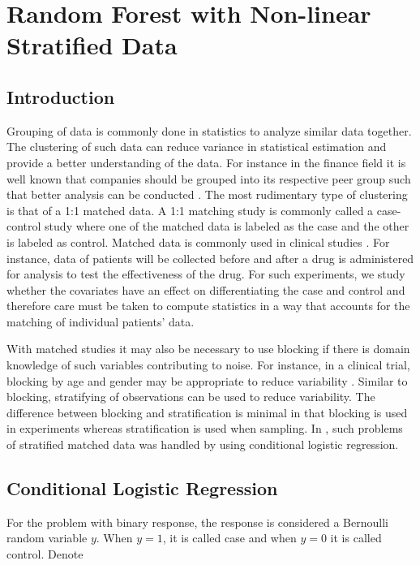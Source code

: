 \chapter{Random Forest with Non-linear Stratified Data}\label{chapter:RFStratum}
\section{Introduction}
Grouping of data is commonly done in statistics to analyze similar data together. The clustering of such data can reduce variance in statistical estimation and provide a better understanding of the data. For instance in the finance field it is well known that companies should be grouped into its respective peer group such that better analysis can be conducted \citep{Daniel97} \citep{Faulkender10}\citep{Bizjak08}\citep{Marsili02}. The most rudimentary type of clustering is that of a 1:1 matched data. A 1:1 matching study is commonly called a case-control study where one of the matched data is labeled as the case and the other is labeled as control. 
Matched data is commonly used in clinical studies \citep{Berg10}\citep{Austin08}. For instance, data of patients will be collected before and after a drug is administered for analysis to test the effectiveness of the drug. For such experiments, we study whether the covariates have an effect on differentiating the case and control and therefore care must be taken to compute statistics in a way that accounts for the matching of individual patients' data.

With matched studies it may also be necessary to use blocking if there is domain knowledge of such variables contributing to noise. For instance, in a clinical trial, blocking by age and gender may be appropriate to reduce variability \citep{Crespo11}. Similar to blocking, stratifying of observations can be used to reduce variability. The difference between blocking and stratification is minimal in that blocking is used in experiments whereas stratification is used when sampling. In \citet{Hosmer00}, such problems of stratified matched data was handled by using conditional logistic regression.

\section{Conditional Logistic Regression}\label{sec:clr}
For the problem with binary response, the response is considered a Bernoulli random variable $y$. When $y=1$, it is called case and when $y=0$ it is called control. Denote 

